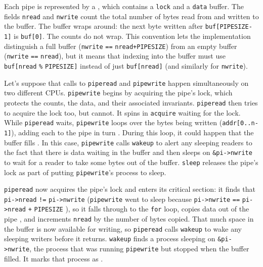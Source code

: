 Each pipe
is represented by a 
,
which contains
a 
\lstinline{lock}
and a 
\lstinline{data}
buffer.
The fields
\lstinline{nread}
and
\lstinline{nwrite}
count the total number of bytes read from
and written to the buffer.
The buffer wraps around:
the next byte written after
\lstinline{buf[PIPESIZE-1]}
is 
\lstinline{buf[0]}.
The counts do not wrap.
This convention lets the implementation
distinguish a full buffer 
(\lstinline{nwrite}
\lstinline{==}
\lstinline{nread+PIPESIZE})
from an empty buffer
(\lstinline{nwrite}
\lstinline{==}
\lstinline{nread}),
but it means that indexing into the buffer
must use
\lstinline{buf[nread}
\lstinline{%}
\lstinline{PIPESIZE]}
instead of just
\lstinline{buf[nread]} 
(and similarly for
\lstinline{nwrite}).

Let's suppose that calls to
\lstinline{piperead}
and
\lstinline{pipewrite}
happen simultaneously on two different CPUs.
\lstinline{pipewrite}
begins by acquiring the pipe's lock, which
protects the counts, the data, and their
associated invariants.
\lstinline{piperead}
then tries to acquire the lock too, but cannot.
It spins in
\lstinline{acquire}
waiting for the lock.
While
\lstinline{piperead}
waits,
\lstinline{pipewrite}
loops over the bytes being written
(\lstinline{addr[0..n-1]}),
adding each to the pipe in turn
.
During this loop, it could happen that
the buffer fills
.
In this case, 
\lstinline{pipewrite}
calls
\lstinline{wakeup}
to alert any sleeping readers to the fact
that there is data waiting in the buffer
and then sleeps on
\lstinline{&pi->nwrite}
to wait for a reader to take some bytes
out of the buffer.
\lstinline{sleep}
releases 
the pipe's lock
as part of putting
\lstinline{pipewrite}'s
process to sleep.

\lstinline{piperead}
now acquires the pipe's lock and enters its critical section:
it finds that
\lstinline{pi->nread}
\lstinline{!=}
\lstinline{pi->nwrite}
(\lstinline{pipewrite}
went to sleep because
\lstinline{pi->nwrite}
\lstinline{==}
\lstinline{pi->nread}
\lstinline{+}
\lstinline{PIPESIZE}
),
so it falls through to the 
\lstinline{for}
loop, copies data out of the pipe
,
and increments 
\lstinline{nread}
by the number of bytes copied.
That much space in the buffer is now available for writing, so
\lstinline{piperead}
calls
\lstinline{wakeup}
to wake any sleeping writers
before it returns.
\lstinline{wakeup}
finds a process sleeping on
\lstinline{&pi->nwrite},
the process that was running
\lstinline{pipewrite}
but stopped when the buffer filled.
It marks that process as
.

